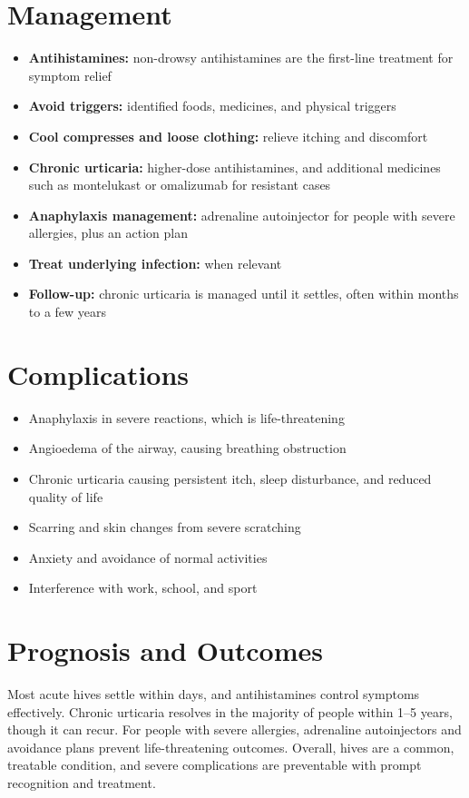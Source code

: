 \section*{Management}
\begin{itemize}
    \item \textbf{Antihistamines:} non-drowsy antihistamines are the first-line treatment for symptom relief
    \item \textbf{Avoid triggers:} identified foods, medicines, and physical triggers
    \item \textbf{Cool compresses and loose clothing:} relieve itching and discomfort
    \item \textbf{Chronic urticaria:} higher-dose antihistamines, and additional medicines such as montelukast or omalizumab for resistant cases
    \item \textbf{Anaphylaxis management:} adrenaline autoinjector for people with severe allergies, plus an action plan
    \item \textbf{Treat underlying infection:} when relevant
    \item \textbf{Follow-up:} chronic urticaria is managed until it settles, often within months to a few years
\end{itemize}

\section*{Complications}
\begin{itemize}
    \item Anaphylaxis in severe reactions, which is life-threatening
    \item Angioedema of the airway, causing breathing obstruction
    \item Chronic urticaria causing persistent itch, sleep disturbance, and reduced quality of life
    \item Scarring and skin changes from severe scratching
    \item Anxiety and avoidance of normal activities
    \item Interference with work, school, and sport
\end{itemize}

\section*{Prognosis and Outcomes}
Most acute hives settle within days, and antihistamines control symptoms effectively. Chronic urticaria resolves in the majority of people within 1--5 years, though it can recur. For people with severe allergies, adrenaline autoinjectors and avoidance plans prevent life-threatening outcomes. Overall, hives are a common, treatable condition, and severe complications are preventable with prompt recognition and treatment.

